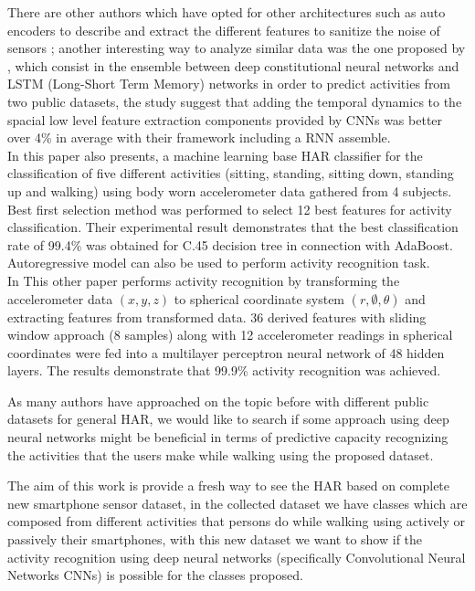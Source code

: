 \documentclass[10pt,halfline,a4paper]{ouparticle}
\begin{document}
\noindent
There are other authors which  have opted for other architectures such as auto encoders to describe and extract the different features to sanitize the noise of sensors \cite{Gaos}; another interesting way to analyze similar data was the one proposed by \cite{Ordonez}, which consist in the ensemble between deep constitutional neural networks and LSTM (Long-Short Term Memory)  networks in order to predict activities from two public datasets, the study suggest that adding the temporal dynamics to the spacial low level feature extraction components provided by CNNs was better over 4\% in average with their framework including a RNN assemble.\\

\noindent
\cite{Ugulino} In this paper also presents, a machine learning base HAR classifier for the classification of five different activities (sitting, standing, sitting down, standing up and walking) using body worn accelerometer data gathered from 4 subjects. Best first selection method was performed to select 12 best features for activity classification. Their experimental result demonstrates that the best classification rate of 99.4\% was obtained for C.45 decision tree in connection with AdaBoost. Autoregressive model can also be used to perform activity recognition task.\\

\noindent
\cite{Zabihi} In This other paper performs activity recognition by transforming the accelerometer data $(x, y, z)$ to spherical coordinate system $(r, \emptyset, \theta)$ and extracting features from transformed data. 36 derived features with sliding window approach (8 samples) along with 12 accelerometer readings in spherical coordinates were fed into a multilayer perceptron neural network of 48 hidden layers. The results demonstrate that 99.9\% activity recognition was achieved.

\noindent
As many authors have approached on the topic before with different public datasets for general HAR, we would like to search if some approach using deep neural networks might be beneficial in terms of predictive capacity recognizing the activities that the users make while walking using the proposed dataset.

\noindent
The aim of this work is provide a fresh way to see the HAR based on complete new smartphone sensor dataset, in the collected dataset we have classes which are composed from different activities that persons do while walking using actively or passively their smartphones, with this new dataset we want to show if the activity recognition using deep neural networks (specifically Convolutional Neural Networks CNNs) is possible for the classes proposed.\\
\end{document}
